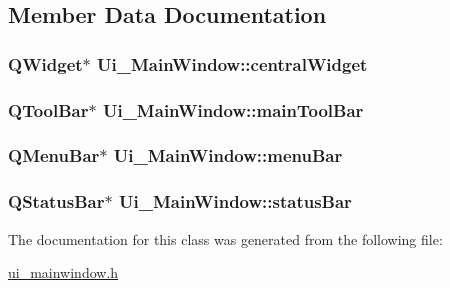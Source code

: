 \subsection{Member Data Documentation}
\hypertarget{class_ui___main_window_a30075506c2116c3ed4ff25e07ae75f81}{
\subsubsection[{central\-Widget}]{\setlength{\rightskip}{0pt plus 5cm}Q\-Widget$\ast$ Ui\-\_\-\-Main\-Window\-::central\-Widget}}\label{class_ui___main_window_a30075506c2116c3ed4ff25e07ae75f81}
\hypertarget{class_ui___main_window_a5172877001c8c7b4e0f6de50421867d1}{
\subsubsection[{main\-Tool\-Bar}]{\setlength{\rightskip}{0pt plus 5cm}Q\-Tool\-Bar$\ast$ Ui\-\_\-\-Main\-Window\-::main\-Tool\-Bar}}\label{class_ui___main_window_a5172877001c8c7b4e0f6de50421867d1}
\hypertarget{class_ui___main_window_a2be1c24ec9adfca18e1dcc951931457f}{
\subsubsection[{menu\-Bar}]{\setlength{\rightskip}{0pt plus 5cm}Q\-Menu\-Bar$\ast$ Ui\-\_\-\-Main\-Window\-::menu\-Bar}}\label{class_ui___main_window_a2be1c24ec9adfca18e1dcc951931457f}
\hypertarget{class_ui___main_window_a50fa481337604bcc8bf68de18ab16ecd}{
\subsubsection[{status\-Bar}]{\setlength{\rightskip}{0pt plus 5cm}Q\-Status\-Bar$\ast$ Ui\-\_\-\-Main\-Window\-::status\-Bar}}\label{class_ui___main_window_a50fa481337604bcc8bf68de18ab16ecd}


The documentation for this class was generated from the following file\-:\begin{DoxyCompactItemize}
\item 
\hyperlink{ui__mainwindow_8h}{ui\-\_\-mainwindow.\-h}\end{DoxyCompactItemize}
